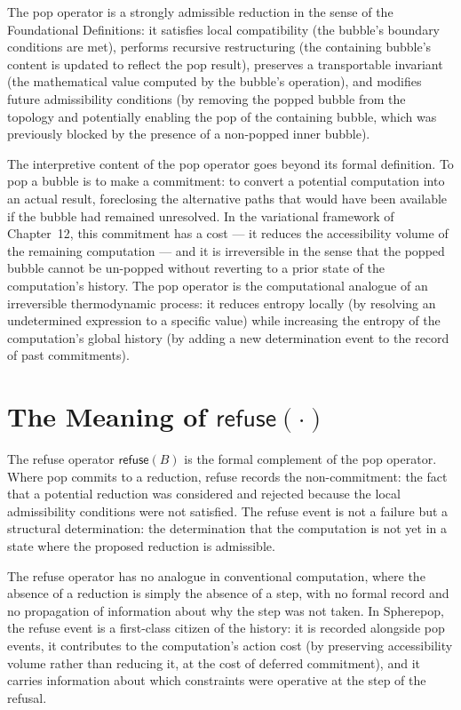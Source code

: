 \documentclass[12pt,openany]{book}
\theoremstyle{plain}
\theoremstyle{definition}
\theoremstyle{remark}
\newcommand{\srefuse}[1]{\mathsf{refuse}\!\left(#1\right)}
\begin{document}
The pop operator is a strongly admissible reduction in the sense of the Foundational Definitions: it satisfies local compatibility (the bubble's boundary conditions are met), performs recursive restructuring (the containing bubble's content is updated to reflect the pop result), preserves a transportable invariant (the mathematical value computed by the bubble's operation), and modifies future admissibility conditions (by removing the popped bubble from the topology and potentially enabling the pop of the containing bubble, which was previously blocked by the presence of a non-popped inner bubble).

The interpretive content of the pop operator goes beyond its formal definition. To pop a bubble is to make a commitment: to convert a potential computation into an actual result, foreclosing the alternative paths that would have been available if the bubble had remained unresolved. In the variational framework of Chapter~12, this commitment has a cost — it reduces the accessibility volume of the remaining computation — and it is irreversible in the sense that the popped bubble cannot be un-popped without reverting to a prior state of the computation's history. The pop operator is the computational analogue of an irreversible thermodynamic process: it reduces entropy locally (by resolving an undetermined expression to a specific value) while increasing the entropy of the computation's global history (by adding a new determination event to the record of past commitments).

\section{The Meaning of \texorpdfstring{$\srefuse{\cdot}$}{refuse}}

The refuse operator $\srefuse{B}$ is the formal complement of the pop operator. Where pop commits to a reduction, refuse records the non-commitment: the fact that a potential reduction was considered and rejected because the local admissibility conditions were not satisfied. The refuse event is not a failure but a structural determination: the determination that the computation is not yet in a state where the proposed reduction is admissible.

The refuse operator has no analogue in conventional computation, where the absence of a reduction is simply the absence of a step, with no formal record and no propagation of information about why the step was not taken. In Spherepop, the refuse event is a first-class citizen of the history: it is recorded alongside pop events, it contributes to the computation's action cost (by preserving accessibility volume rather than reducing it, at the cost of deferred commitment), and it carries information about which constraints were operative at the step of the refusal.
\end{document}
